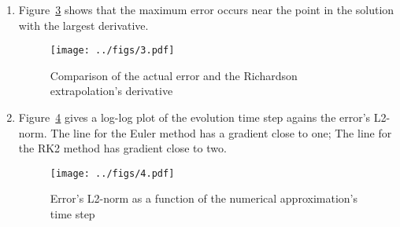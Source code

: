 \documentclass[12pt,a4]{article}
\begin{document}
\begin{enumerate}
\begin{enumerate}
      \item
        Figure~\ref{fig:2b} shows the relationship between the errors when evolving with different time steps.
        Halving the time step decreases the error by a factor of four.
        This relationship confirms that the second order Runge-Kutta method is indeed second order.
        Halving the time-step decreases the error by $2^p = 4$.
        \begin{figure}[H]
          \centering
          \texttt{[image: ../figs/2b.pdf]}
          \caption{Scaled global errors for RK2 evolution of a logistic equation using different time steps}
          \label{fig:2b}
        \end{figure}
      \item
        Figure~\ref{fig:2c} compares the actual global error of the logistic problem's RK2 evolution against the error estimated with the Richardson extrapolation.
        \begin{figure}[H]
          \centering
          \texttt{[image: ../figs/2c.pdf]}
          \caption{Comparison of the actual error with the difference between the Richardson extrapolation and numerical the solution}
          \label{fig:2c}
        \end{figure}
  \end{enumerate}
  \item
    Figure~\ref{fig:3} shows that the maximum error occurs near the point in the solution with the largest derivative.
    \begin{figure}[H]
      \centering
      \texttt{[image: ../figs/3.pdf]}
      \caption{Comparison of the actual error and the Richardson extrapolation's derivative}
      \label{fig:3}
    \end{figure}
  \item
    Figure~\ref{fig:4} gives a log-log plot of the evolution time step agains the error's L2-norm.
    The line for the Euler method has a gradient close to one; The line for the RK2 method has gradient close to two.
    \begin{figure}[H]
      \centering
      \texttt{[image: ../figs/4.pdf]}
      \caption{Error's L2-norm as a function of the numerical approximation's time step}
      \label{fig:4}
    \end{figure}
\end{enumerate}
\end{document}
